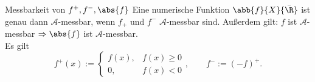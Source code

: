 \begin{karte}{Messbarkeit von \(f^+, f^-, \abs{f}\)}
	Eine numerische Funktion \( \abb{f}{X}{\bar{\R}} \) 
	ist genau dann \( \mathcal{A} \)-messbar, wenn
	\( f_+ \) und \( f^- \) \( \mathcal{A} \)-messbar sind. 
	Außerdem gilt: \( f \) ist \(\mathcal{A}\)-messbar \( \Rightarrow \abs{f} \) ist \( \mathcal{A} \)-messbar.\\
	Es gilt 
	\[ f^+(x) := \begin{cases}
		f(x), & f(x) \geq 0 \\
		0, & f(x) < 0
	\end{cases}, \qquad f^- := (-f)^+. \]
\end{karte}